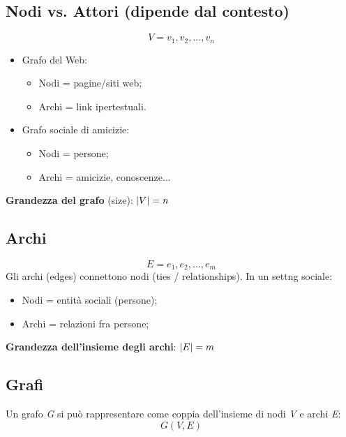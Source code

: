 \documentclass{article}
\begin{document}
  \subsection{Nodi vs. Attori (dipende dal contesto)}
    $$V={v_1,v_2,...,v_n}$$
    \begin{itemize}
        \item Grafo del Web:
           \begin{itemize}
               \item Nodi = pagine/siti web;
               \item Archi = link ipertestuali.
           \end{itemize}
        \item Grafo sociale di amicizie:
          \begin{itemize}
               \item Nodi = persone;
               \item Archi = amicizie, conoscenze...
          \end{itemize}
    \end{itemize}
    \textbf{Grandezza del grafo} (size): $\abs{V}=n$
  \subsection{Archi}
    $$E={e_1,e_2,...,e_m}$$
    Gli archi (edges) connettono nodi (ties / relationships). In un settng sociale:
    \begin{itemize}
        \item Nodi = entità sociali (persone);
        \item Archi = relazioni fra persone;
    \end{itemize}
    \textbf{Grandezza dell'insieme degli archi}: $\abs{E}=m$
  \subsection{Grafi}
    Un grafo \textit{G} si può rappresentare come coppia dell'insieme di nodi \textit{V} e archi \textit{E}:
    $$G(V,E)$$
\end{document}
